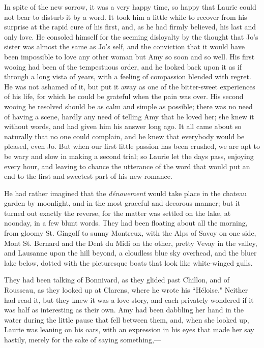 In spite of the new sorrow, it was a very happy time, so happy that
Laurie could not bear to disturb it by a word. It took him a little
while to recover from his surprise at the rapid cure of his first, and,
as he had firmly believed, his last and only love. He consoled himself
for the seeming disloyalty by the thought that Jo's
sister was almost the same as Jo's self, and the
conviction that it would have been impossible to love any other woman
but Amy so soon and so well. His first wooing had been of the
tempestuous order, and he looked back upon it as if through a long vista
of years, with a feeling of compassion blended with regret. He was not
ashamed of it, but put it away as one of the bitter-sweet experiences of
his life, for which he could be grateful when the pain was over. His
second wooing he resolved should be as calm and simple as possible;
there was no need of having a scene, hardly any need of telling Amy that
he loved her; she knew it without words, and had given him his answer
long ago. It all came about so naturally that no one could complain, and
he knew that everybody would be pleased, even Jo. But when our first
little passion has been crushed, we are apt to be wary and slow in
making a second trial; so Laurie let the days pass, enjoying every hour,
and leaving to chance the utterance of the word that would put an end to
the first and sweetest part of his new romance.

He had rather imagined that the \emph{dénouement} would take place in
the chateau garden by moonlight, and in the most graceful and decorous
manner; but it turned out exactly the reverse, for the matter was
settled on the lake, at noonday, in a few blunt words. They had been
floating about all the morning, from gloomy St. Gingolf to sunny
Montreux, with the Alps of Savoy on one side, Mont St. Bernard and the
Dent du Midi on the other, pretty Vevay in the valley, and Lausanne upon
the hill beyond, a cloudless blue sky overhead, and the bluer lake
below, dotted with the picturesque boats that look like white-winged
gulls.

They had been talking of Bonnivard, as they glided past Chillon, and of
Rousseau, as they looked up at Clarens, where he wrote his ``Héloise."
Neither had read it, but they knew it was a love-story, and each
privately wondered if it was half as interesting as their own. Amy had
been dabbling her hand in the water during the little pause that fell
between them, and, when she looked up, Laurie was leaning on his oars,
with an expression in his eyes that made her say hastily, merely for the
sake of saying something,---

